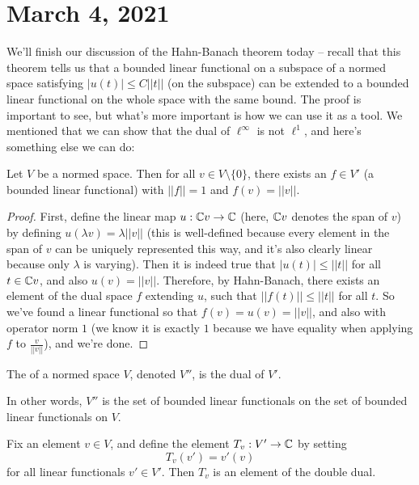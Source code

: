 \pagebreak\section*{March 4, 2021}

We'll finish our discussion of the Hahn-Banach theorem today -- recall that this theorem tells us that a bounded linear functional on a subspace of a normed space satisfying $|u(t)| \le C||t||$ (on the subspace) can be extended to a bounded linear functional on the whole space with the same bound. The proof is important to see, but what's more important is how we can use it as a tool. We mentioned that we can show that the dual of $\ell^{\infty}$ is not $\ell^1$, and here's something else we can do:

\begin{theorem}\label{hahnbanachapp1}
Let $V$ be a normed space. Then for all $v \in V \setminus \{0\}$, there exists an $f \in V'$ (a bounded linear functional) with $||f|| = 1$ and $f(v) = ||v||$.
\end{theorem}
\begin{proof}
First, define the linear map $u: \mathbb C v \to \mathbb C$ (here, $\mathbb C v$ denotes the span of $v$) by defining $u(\lambda v) = \lambda ||v||$ (this is well-defined because every element in the span of $v$ can be uniquely represented this way, and it's also clearly linear because only $\lambda$ is varying). Then it is indeed true that $|u(t)| \le ||t||$ for all $t \in \mathbb C v$, and also $u(v) = ||v||$. Therefore, by Hahn-Banach, there exists an element of the dual space $f$ extending $u$, such that $||f(t)|| \le ||t||$ for all $t$. So we've found a linear functional so that $f(v) = u(v) = ||v||$, and also with operator norm $1$ (we know it is exactly $1$ because we have equality when applying $f$ to $\frac{v}{||v||}$), and we're done. 
\end{proof}

\begin{definition}
The  of a normed space $V$, denoted $V''$, is the dual of $V'$.
\end{definition}

In other words, $V''$ is the set of bounded linear functionals on the set of bounded linear functionals on $V$. 

\begin{example}
Fix an element $v \in V$, and define the element $T_v: V' \to \mathbb C$ by setting 
\[
    T_v(v') = v'(v)
\]
for all linear functionals $v' \in V'$. Then $T_v$ is an element of the double dual.
\end{example}

